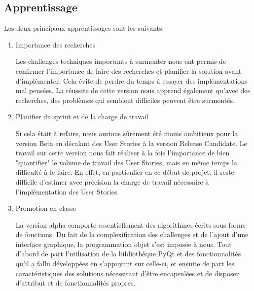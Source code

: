 \subsection{Apprentissage}

Les deux principaux apprentissages sont les suivants:

\begin{enumerate}
    \item Importance des recherches

          Les challenges techniques importants à surmonter nous ont permis de confirmer l’importance de faire des recherches et
          planifier la solution avant d’implémenter. Cela évite de perdre du temps à essayer des implémentations mal pensées.
          La réussite de cette version nous apprend également qu’avec des recherches, des problèmes qui semblent difficiles
          peuvent être surmontés.
    \item Planifier du sprint et de la charge de travail

          Si cela était à refaire, nous aurions sûrement été moins ambitieux pour la version Beta en décalant des User Stories
          à la version Release Candidate. Le travail sur cette version nous fait réaliser à la fois l'importance de bien "quantifier"
          le volume de travail des User Stories, mais en même temps la difficulté à le faire. En effet, en particulier en ce début de projet,
          il reste difficile d’estimer avec précision la charge de travail nécessaire à l'implémentation des User Stories.

    \item Promotion en classe

          La version alpha comporte essentiellement des algorithmes écrits sous forme de fonctions. Du fait de la complexification
          des challenges et de l’ajout d’une interface graphique, la programmation objet s’est imposée à nous. Tout d’abord de part
          l’utilisation de la bibliothèque PyQt et des fonctionnalités qu’il a fallu développées en s’appuyant sur celle-ci, et ensuite
          de part les caractéristiques des solutions nécessitant d’être encapsulées et de disposer d’attribut et de fonctionnalités propres.

\end{enumerate}
